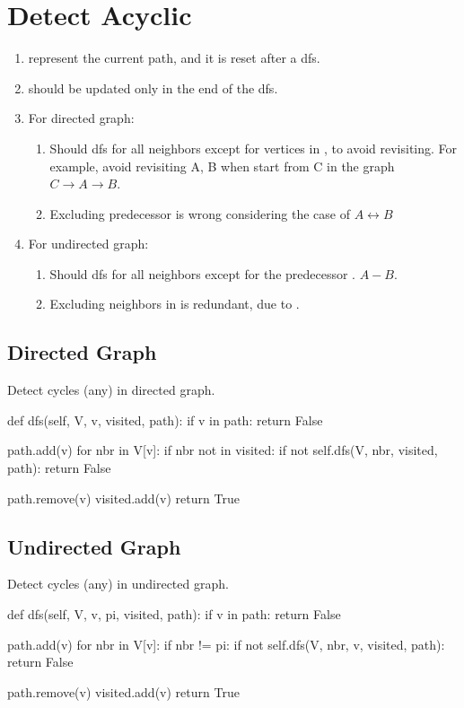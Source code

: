 \section{Detect Acyclic}
\begin{enumerate}
\item {} represent the current path, and it is reset after a dfs.
\item {} should be updated only in the end of the dfs.
\item For directed graph:
\begin{enumerate}
\item Should dfs for all neighbors except for vertices in , to avoid revisiting. For example, avoid revisiting A, B when start from C in the graph $C \rightarrow A \rightarrow B$.
\item Excluding predecessor  is wrong considering the case of $A \leftrightarrow B$
\end{enumerate}
\item For undirected graph:
\begin{enumerate}
\item Should dfs for all neighbors except for the predecessor . $A-B$.
\item Excluding neighbors in  is redundant, due to .
\end{enumerate}
\end{enumerate}

\subsection{Directed Graph}
Detect cycles (any) in directed graph.

\begin{python}
def dfs(self, V, v, visited, path):
  if v in path:
    return False

  path.add(v)
  for nbr in V[v]:
    if nbr not in visited:
      if not self.dfs(V, nbr, visited, path):
        return False

  path.remove(v)
  visited.add(v)
  return True
\end{python}


\subsection{Undirected Graph}
Detect cycles (any) in undirected graph.

\begin{python}
def dfs(self, V, v, pi, visited, path):
  if v in path:
    return False

  path.add(v)
  for nbr in V[v]:
    if nbr != pi:
      if not self.dfs(V, nbr, v, visited, path):
        return False

  path.remove(v)
  visited.add(v)
  return True
\end{python}
